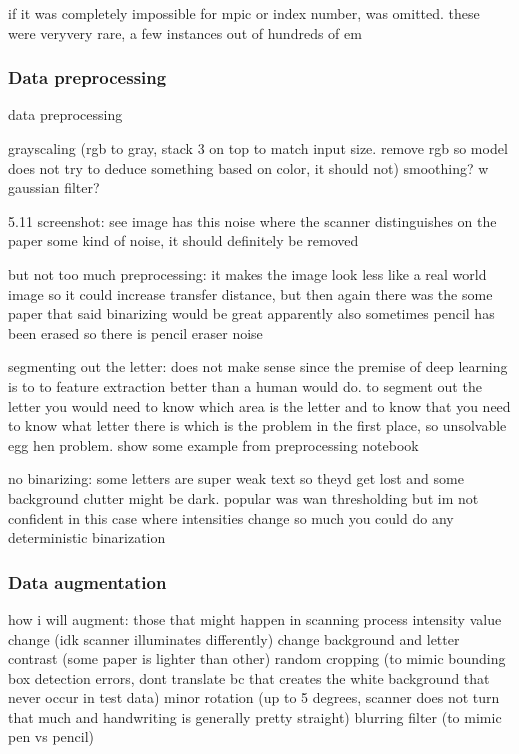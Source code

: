 \documentclass{article}
\begin{document}
if it was completely impossible for mpic or index number, was omitted. these were veryvery rare, a few instances out of hundreds of em

\subsubsection{Data preprocessing}

data preprocessing

grayscaling (rgb to gray, stack 3 on top to match input size. remove rgb so model does not try to deduce something based on color, it should not)
smoothing? w gaussian filter?

5.11 screenshot: see image has this noise where the scanner distinguishes on the paper some kind of noise, it should definitely be removed

but not too much preprocessing: it makes the image look less like a real world image so it could increase transfer distance, 
but then again there was the some paper that said binarizing would be great
apparently also sometimes pencil has been erased so there is pencil eraser noise

segmenting out the letter: does not make sense since the premise of deep learning is 
to to feature extraction better than a human would do. to segment out the letter you would 
need to know which area is the letter and to know that you need to know what letter there 
is which is the problem in the first place, so unsolvable egg hen problem. show some example from preprocessing notebook

no binarizing: some letters are super weak text so theyd get lost and some background clutter might be dark.
popular was wan thresholding but im not confident in this case where intensities change so much you could 
do any deterministic binarization

\subsubsection{Data augmentation}

how i will augment: those that might happen in scanning process
intensity value change (idk scanner illuminates differently)
change background and letter contrast (some paper is lighter than other)
random cropping (to mimic bounding box detection errors, dont translate bc that creates the white background that never occur in test data)
minor rotation (up to 5 degrees, scanner does not turn that much and handwriting is generally pretty straight)
blurring filter (to mimic pen vs pencil)
\end{document}

